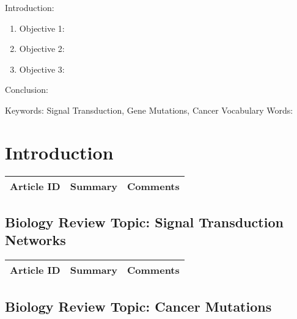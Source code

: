 
\twocolumn
\scriptsize
\begin{frontmatter}
		\title{}
		\author{}
		\address{The Mathematical Learning Space}
\end{frontmatter}	

Introduction:
\begin{enumerate}
\item Objective 1:
\item Objective 2:
\item Objective 3:
\end{enumerate}
Conclusion:

Keywords: Signal Transduction, Gene Mutations, Cancer
Vocabulary Words:

\section{Introduction}

\begin{table}[H]\centering
	\begin{tabular}{p{1cm}p{4cm}p{3cm}}
		Article ID & Summary & Comments\\
		\hline
		\hline
	\end{tabular}
\end{table}

\subsection{Biology Review Topic: Signal Transduction Networks}

\begin{table}[H]\centering
	\begin{tabular}{p{1cm}p{4cm}p{3cm}}
		Article ID & Summary & Comments\\
		\hline
		\hline
	\end{tabular}
\end{table}

\subsection{Biology Review Topic: Cancer Mutations}

